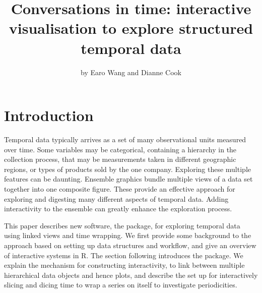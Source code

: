 \title{Conversations in time: interactive visualisation to explore
structured temporal data}
\author{by Earo Wang and Dianne Cook}

\maketitle


\hypertarget{introduction}{%
\section{Introduction}\label{introduction}}

Temporal data typically arrives as a set of many observational units
measured over time. Some variables may be categorical, containing a
hierarchy in the collection process, that may be measurements taken in
different geographic regions, or types of products sold by the one
company. Exploring these multiple features can be daunting. Ensemble
graphics \citep{unwin_ensemble_2018} bundle multiple views of a data set
together into one composite figure. These provide an effective approach
for exploring and digesting many different aspects of temporal data.
Adding interactivity to the ensemble can greatly enhance the exploration
process.

This paper describes new software, the  package,
for exploring temporal data using linked views and time wrapping. We
first provide some background to the approach based on setting up data
structures and workflow, and give an overview of interactive systems in
R. The section following introduces the  package.
We explain the mechanism for constructing interactivity, to link between
multiple hierarchical data objects and hence plots, and describe the set
up for interactively slicing and dicing time to wrap a series on itself
to investigate periodicities.


